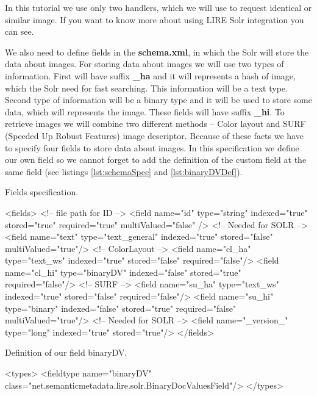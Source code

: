 \documentclass[12pt,a4paper]{report}
\begin{document}
In this tutorial we use only two handlers, which we will use to request identical or similar image. If you want to know more about using LIRE Solr integration you can see\cite{liresolr}.

We also need to define fields in the \textbf{schema.xml}, in which the Solr will store the data about images. For storing data about images we will use two types of information. First will have suffix \textbf{\_ha} and it will represents a hash of image, which the Solr need for fast searching. This information will be a text type. Second type of information will be a binary type and it will be used to store some data, which will represents the image. These fields will have suffix \textbf{\_hi}. To retrieve images we will combine two different methods -- Color layout and SURF (Speeded Up Robust Features) image descriptor. Because of these facts we have to specify four fields to store data about images. In this specification we define our own field so we cannot forget to add the definition of the custom field at the same field (see listings \ref{lst:schemaSpec} and \ref{lst:binaryDVDef}).

\begin{listing}[H]
\caption{Fields specification.}
\label{lst:schemaSpec}
\begin{xmlcode}
<fields>
   <!-- file path for ID -->
   <field name="id" type="string" indexed="true"
   stored="true" required="true" multiValued="false" />
   <!-- Needed for SOLR -->
   <field name="text" type="text_general" indexed="true"
   stored="false" multiValued="true"/>
   <!-- ColorLayout -->
   <field name="cl_ha" type="text_ws" indexed="true"
   stored="false" required="false"/>
   <field name="cl_hi" type="binaryDV"  indexed="false"
   stored="true" required="false"/>
   <!-- SURF -->
   <field name="su_ha" type="text_ws" indexed="true"
   stored="false" required="false"/>
   <field name="su_hi" type="binary"  indexed="false"
   stored="true" required="false" multiValued="true"/>
   <!-- Needed for SOLR -->
   <field name="_version_" type="long" indexed="true"
   stored="true"/>
</fields>
\end{xmlcode}
\end{listing}

\begin{listing}[H]
\caption{Definition of our field binaryDV.}
\label{lst:binaryDVDef}
\begin{xmlcode}
<types>
 <fieldtype name="binaryDV"
 class="net.semanticmetadata.lire.solr.BinaryDocValuesField"/>
</types>
\end{xmlcode}
\end{listing}
\end{document}
